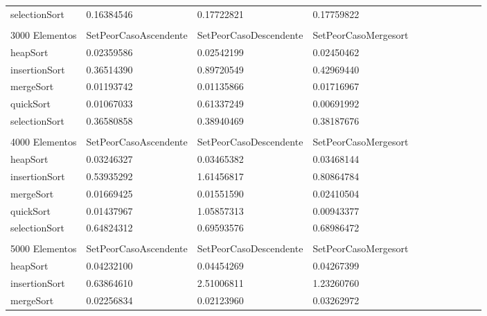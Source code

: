 \documentclass[article,a4paper]{article}
\begin{document}
\begin{table}[h]
\begin{adjustbox}{width=\textwidth,totalheight=\textheight,keepaspectratio}
\begin{tabular}{lllllllllll}
selectionSort   & 0.16384546            & 0.17722821             & 0.17759822           \\
                &                       &                        &                      \\
3000 Elementos  & SetPeorCasoAscendente & SetPeorCasoDescendente & SetPeorCasoMergesort \\
heapSort        & 0.02359586            & 0.02542199             & 0.02450462           \\
insertionSort   & 0.36514390            & 0.89720549             & 0.42969440           \\
mergeSort       & 0.01193742            & 0.01135866             & 0.01716967           \\
quickSort       & 0.01067033            & 0.61337249             & 0.00691992           \\
selectionSort   & 0.36580858            & 0.38940469             & 0.38187676           \\
                &                       &                        &                      \\
4000 Elementos  & SetPeorCasoAscendente & SetPeorCasoDescendente & SetPeorCasoMergesort \\
heapSort        & 0.03246327            & 0.03465382             & 0.03468144           \\
insertionSort   & 0.53935292            & 1.61456817             & 0.80864784           \\
mergeSort       & 0.01669425            & 0.01551590             & 0.02410504           \\
quickSort       & 0.01437967            & 1.05857313             & 0.00943377           \\
selectionSort   & 0.64824312            & 0.69593576             & 0.68986472           \\
                &                       &                        &                      \\
5000 Elementos  & SetPeorCasoAscendente & SetPeorCasoDescendente & SetPeorCasoMergesort \\
heapSort        & 0.04232100            & 0.04454269             & 0.04267399           \\
insertionSort   & 0.63864610            & 2.51006811             & 1.23260760           \\
mergeSort       & 0.02256834            & 0.02123960             & 0.03262972           \\

\end{tabular}
\end{adjustbox}
\end{table}
\end{document}
